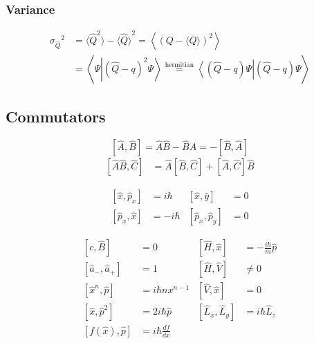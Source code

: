 \subsubsection{Variance}
\noindent\begin{align*}
    {\sigma_{\widehat{Q}}}^2 & = \langle {\widehat{Q}}^2 \rangle - {\langle \widehat{Q} \rangle }^2 =\left\langle{\left(Q-\langle Q\rangle\right)}^{2}\right\rangle                                                               \\
                             & =\left\langle\Psi\left|{\left(\widehat{Q}-q\right)}^{2}\Psi\right\rangle\stackrel{\text{hermitian}}{=}\left\langle\left(\widehat{Q}-q\right)\Psi\right|\left(\widehat{Q}-q\right)\Psi\right\rangle
\end{align*}


\subsection{Commutators}

\noindent\begin{equation*}
    \left[\widehat{A},\widehat{B}\right] = \widehat{A}\widehat{B} - \widehat{B}\widehat{A} = -\left[\widehat{B},\widehat{A}\right]
\end{equation*}
\noindent\begin{align*}
    \left[\widehat{A}\widehat{B},\widehat{C}\right] & =\widehat{A}\left[\widehat{B},\widehat{C}\right]+\left[\widehat{A},\widehat{C}\right]\widehat{B}
\end{align*}


\noindent\begin{align*}
    \left[\widehat{x},\widehat{p}_x\right]  & = i\hbar  & \left[\widehat{x}, \widehat{y}\right]     & = 0 \\
    \left[\widehat{p}_x, \widehat{x}\right] & = -i\hbar & \left[\widehat{p}_x, \widehat{p}_y\right] & = 0
\end{align*}

\noindent\begin{align*}
    \left[c,\hat B\right]                        & =0                     & \left[\widehat{H},\widehat{x}\right]     & =-\frac{i\hbar}{m}\widehat{p} \\
    \left[\widehat{a}_{-},\widehat{a}_{+}\right] & = 1                    & \left[\widehat{H}, \widehat{V}\right]    & \neq 0                        \\
    \left[\widehat{x}^n,\widehat{p}\right]       & = i \hbar n x^{n-1}    & \left[\widehat{V},\widehat{x}\right]     & =0                            \\
    \left[\widehat{x},\widehat{p}^2\right]       & = 2i\hbar\widehat{p}   & \left[\widehat{L}_x,\widehat{L}_y\right] & =i\hbar\widehat{L}_z          \\
    \left[f(\widehat{x}),\widehat{p}\right]      & = i \hbar\frac{df}{dx} &                                          &
\end{align*}

